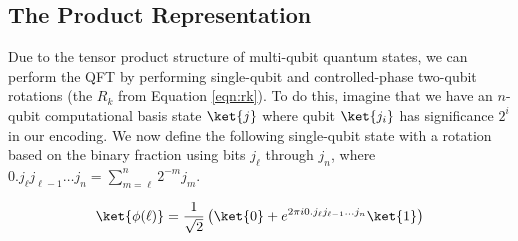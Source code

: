 

\subsection{The Product Representation}


Due to the tensor product structure of multi-qubit quantum states, we can
perform the QFT by performing single-qubit and controlled-phase two-qubit
rotations (the $R_k$ from Equation \ref{eqn:rk}). To do this, imagine that
we have an $n$-qubit computational basis state $\ket{j}$ where
qubit $\ket{j_i}$ has significance $2^i$ in our encoding. We now define the
following single-qubit state with a rotation based on the binary fraction
using bits $j_\ell$ through $j_n$, where $0.j_{\ell} j_{\ell-1} \ldots j_{n} =
\sum_{m=\ell}^n 2^{-m}j_m$.

\begin{equation}
\ket{\phi(\ell)} = \frac{1}{\sqrt{2}}\left( \ket{0} +
e^{2\pi i 0.j_\ell j_{\ell-1} \ldots j_n} \ket{1} \right)
\end{equation}

